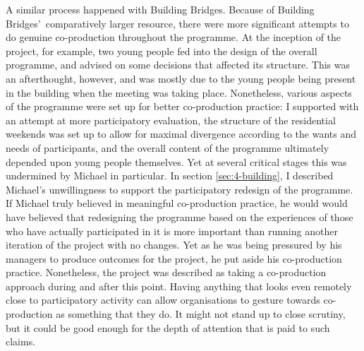 A similar process happened with Building Bridges. Because of Building Bridges'\ comparatively larger resource, there were more significant attempts to do genuine co-production throughout the programme. At  the inception of the project, for example, two young people fed into the design of the overall programme, and advised on some decisions that affected its structure. This was an afterthought, however, and was mostly due to the young people being present in the building when the meeting was taking place. Nonetheless, various aspects of the programme were set up for better co-production practice: I supported with an attempt at more participatory evaluation, the structure of the residential weekends was set up to allow for maximal divergence according to the wants and needs of participants, and the overall content of the programme ultimately depended upon young people themselves. Yet at several critical stages this was undermined by Michael in particular. In  section \ref{sec:4-building}, I described Michael's unwillingness to support the participatory redesign of the programme. If Michael truly believed in meaningful co-production practice, he would would have believed that redesigning the programme based on the experiences of those who have actually participated in it is more important than running another iteration of the project with no changes. Yet as he was being pressured by his managers to produce outcomes for the project, he put aside his co-production practice. Nonetheless, the project was described as taking a co-production approach during and after this point. Having anything that looks even remotely close to participatory activity can allow organisations to gesture towards co-production as something that they do. It might not stand up to close scrutiny, but it could be good enough for the depth of attention that is paid to such claims. 

